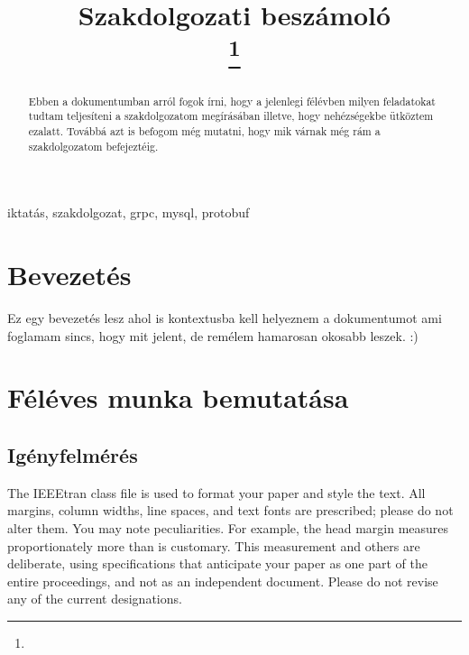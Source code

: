 \documentclass[conference]{IEEEtran}
\begin{document}
\title{Szakdolgozati beszámoló\\

\thanks{}
}

\author{
}

\maketitle

\begin{abstract}
Ebben a dokumentumban arról fogok írni, hogy a jelenlegi félévben milyen feladatokat tudtam teljesíteni a szakdolgozatom megírásában illetve, hogy nehézségekbe ütköztem ezalatt. Továbbá azt is befogom még mutatni, hogy mik várnak még rám a szakdolgozatom befejeztéig. 
\end{abstract}

\begin{IEEEkeywords}
iktatás, szakdolgozat, grpc, mysql, protobuf
\end{IEEEkeywords}

\section{Bevezetés}
Ez egy bevezetés lesz ahol is kontextusba kell helyeznem a dokumentumot ami foglamam sincs, hogy mit jelent, de remélem hamarosan okosabb leszek. :)

\section{Féléves munka bemutatása}

\subsection{\textbf{Igényfelmérés}}

The IEEEtran class file is used to format your paper and style the text. All margins, 
column widths, line spaces, and text fonts are prescribed; please do not 
alter them. You may note peculiarities. For example, the head margin
measures proportionately more than is customary. This measurement 
and others are deliberate, using specifications that anticipate your paper 
as one part of the entire proceedings, and not as an independent document. 
Please do not revise any of the current designations.
\end{document}

